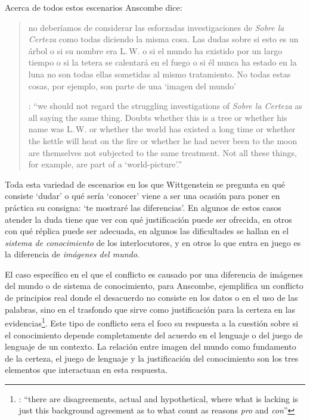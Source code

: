 Acerca de todos estos escenarios Anscombe dice: \blockquote[{\cite[130]{anscombe1981parmenides:qli}}: \enquote{we should not regard the struggling investigations of \emph{Sobre la Certeza} as all saying the same thing. Doubts whether this is a tree or whether his name was L.\,W. or whether the world has existed a long time or whether the kettle will heat on the fire or whether he had never been to the moon are themselves not subjected to the same treatment. Not all these things, for example, are part of a `world-picture'.}]{no deberíamos de considerar las esforzadas investigaciones de \emph{Sobre la Certeza} como todas diciendo la misma cosa. Las dudas sobre si esto es un árbol o si su nombre era L.\,W. o si el mundo ha existido por un largo tiempo o si la tetera se calentará en el fuego o si él nunca ha estado en la luna no son todas ellas sometidas al mismo tratamiento. No todas estas cosas, por ejemplo, son parte de una `imagen del mundo'}. Toda esta variedad de escenarios en los que Wittgenstein se pregunta en qué consiste `dudar' o qué sería `conocer' viene a ser una ocasión para poner en práctica su consigna: \enquote*{te mostraré las diferencias}. En algunos de estos casos atender la duda tiene que ver con qué justificación puede ser ofrecida, en otros con qué réplica puede ser adecuada, en algunos las dificultades se hallan en el \emph{sistema de conocimiento} de los interlocutores, y en otros lo que entra en juego es la diferencia de \emph{imágenes del mundo}.

El caso específico en el que el conflicto es causado por una diferencia de imágenes del mundo o de sistema de conocimiento, para Anscombe, ejemplifica un conflicto de principios real donde el desacuerdo no consiste en los datos o en el uso de las palabras, sino en el trasfondo que sirve como justificación para la certeza en las evidencias\footnote{\cite[Cf.~][222]{teichmann2008ans}: \enquote{there are disagreements, actual and hypothetical, where what is lacking is just this background agreement as to what count as reasons \emph{pro} and \emph{con}}}. Este tipo de conflicto sera el foco su respuesta a la cuestión sobre si el conocimiento depende completamente del acuerdo en el lenguaje o del juego de lenguaje de un contexto. La relación entre imagen del mundo como fundamento de la certeza, el juego de lenguaje y la justificación del conocimiento son los tres elementos que interactuan en esta respuesta.

